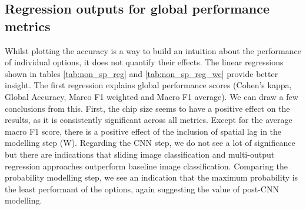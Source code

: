 \subsection*{Regression outputs for global performance metrics}
Whilst plotting the accuracy is a way to build an intuition about the performance of
individual options, it does not quantify their effects. The linear regressions shown in
tables \ref{tab:non_sp_reg} and \ref{tab:non_sp_reg_wc} provide better insight. The
first regression explains global performance scores (Cohen's kappa, Global Accuracy, Marco F1
weighted and Macro F1 average). We can draw a few conclusions from this. First, the chip size
seems to have a positive effect on the results, as it is consistently
significant across all metrics. Except for the average macro F1 score, there is a
positive effect of the inclusion of spatial lag in the modelling step (W). Regarding the
CNN step, we do not see a lot of significance but there are indications that sliding
image classification and multi-output regression approaches outperform baseline image
classification. Comparing the probability modelling step, we see an indication that the
maximum probability is the least performant of the options, again suggesting the value
of post-CNN modelling.


